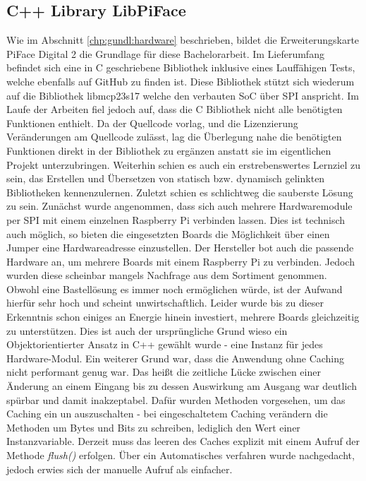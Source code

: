 \subsection{C++ Library LibPiFace}
Wie im Abschnitt \ref{chp:gundl:hardware} beschrieben, bildet die Erweiterungskarte PiFace Digital 2 \cite{URL:PiFaceDigital2} die Grundlage für diese Bachelorarbeit. Im Lieferumfang befindet sich eine in C geschriebene Bibliothek inklusive eines Lauffähigen Tests, welche ebenfalls auf GitHub \cite{URL:PiFaceDigital2GIT} zu finden ist. Diese Bibliothek stützt sich wiederum auf die Bibliothek libmcp23s17 \cite{URL:libmcp23s17} welche den verbauten SoC über SPI anspricht. Im Laufe der Arbeiten fiel jedoch auf, dass die C Bibliothek nicht alle benötigten Funktionen enthielt. Da der Quellcode vorlag, und die Lizenzierung Veränderungen am Quellcode zulässt, lag die Überlegung nahe die benötigten Funktionen direkt in der Bibliothek zu ergänzen anstatt sie im eigentlichen Projekt unterzubringen. Weiterhin schien es auch ein erstrebenswertes Lernziel zu sein, das Erstellen und Übersetzen von statisch bzw. dynamisch gelinkten Bibliotheken kennenzulernen. Zuletzt schien es schlichtweg die sauberste Lösung zu sein. Zunächst wurde angenommen, dass sich auch mehrere Hardwaremodule per SPI mit einem einzelnen Raspberry Pi verbinden lassen. Dies ist technisch auch möglich, so bieten die eingesetzten Boards die Möglichkeit über einen Jumper eine Hardwareadresse einzustellen. Der Hersteller bot auch die passende Hardware an, um mehrere Boards mit einem Raspberry Pi zu verbinden. Jedoch wurden diese scheinbar mangels Nachfrage aus dem Sortiment genommen. Obwohl eine Bastellösung es immer noch ermöglichen würde, ist der Aufwand hierfür sehr hoch und scheint unwirtschaftlich. Leider wurde bis zu dieser Erkenntnis schon einiges an Energie hinein investiert, mehrere Boards gleichzeitig zu unterstützen. Dies ist auch der ursprüngliche Grund wieso ein Objektorientierter Ansatz in C++ gewählt wurde - eine Instanz für jedes Hardware-Modul. Ein weiterer Grund war, dass die Anwendung ohne Caching nicht performant genug war. Das heißt die zeitliche Lücke zwischen einer Änderung an einem Eingang bis zu dessen Auswirkung am Ausgang war deutlich spürbar und damit inakzeptabel. Dafür wurden Methoden vorgesehen, um das Caching ein un auszuschalten - bei eingeschaltetem Caching verändern die Methoden um Bytes und Bits zu schreiben, lediglich den Wert einer Instanzvariable. Derzeit muss das leeren des Caches explizit mit einem Aufruf der Methode \textit{flush()} erfolgen. Über ein Automatisches verfahren wurde nachgedacht, jedoch erwies sich der manuelle Aufruf als einfacher. 

